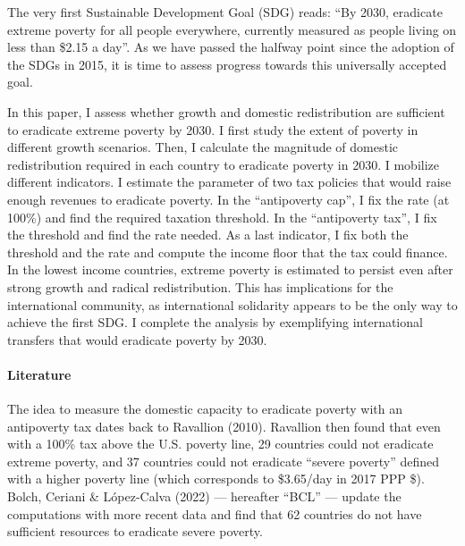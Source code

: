 The very first Sustainable Development Goal (SDG) %
reads: ``By 2030, eradicate extreme poverty for all people everywhere, currently measured as people living on less than \$2.15 a day''. As we have passed the halfway point since the adoption of the SDGs in 2015, it is time to assess progress towards this universally accepted goal. 

In this paper, I assess whether growth and domestic redistribution are sufficient to eradicate extreme poverty by 2030. I first study the extent of poverty in different growth scenarios. Then, I calculate the magnitude of domestic redistribution required in each country to eradicate poverty in 2030. I mobilize different indicators. I estimate the parameter of two tax policies that would raise enough revenues to eradicate poverty. In the ``antipoverty cap'', I fix the rate (at 100\%) and find the required taxation threshold. In the ``antipoverty tax'', I fix the threshold and find the rate needed. As a last indicator, I fix both the threshold and the rate and compute the income floor that the tax could finance. In the lowest income countries, extreme poverty is estimated to persist even after strong growth and radical redistribution. %
This has implications for the international community, as international solidarity appears to be the only way to achieve the first SDG. I complete the analysis by exemplifying international transfers that would eradicate poverty by 2030.

\paragraph{Literature} 

The idea to measure the domestic capacity to eradicate poverty with an antipoverty tax dates back to Ravallion (2010).\cite{ravallion_poorer_2010,ceriani_income_2014} Ravallion then found that even with a 100\% tax above the U.S. poverty line, 29 countries could not eradicate extreme poverty, and 37 countries could not eradicate ``severe poverty'' defined with a higher poverty line (which corresponds to \$3.65/day in 2017 PPP \$). %
Bolch, Ceriani \& López-Calva (2022) --- hereafter ``BCL'' --- update the computations with more recent data and find that 62 countries do not have sufficient resources to eradicate severe poverty.\cite{bolch_arithmetics_2022} %

